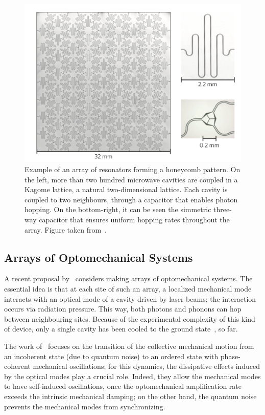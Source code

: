 \begin{figure}
    \centering
    \includegraphics[scale=0.6]{Figures/superconducting_circuits.png}
    \captionsetup{width=1.\linewidth}
    \caption{Example of an array of resonators forming a honeycomb pattern. On the left, more than two hundred microwave cavities are coupled in a Kagome lattice, a natural two-dimensional lattice. Each cavity is coupled to two neighbours, through a capacitor that enables photon hopping. On the bottom-right, it can be seen the simmetric three-way capacitor that ensures uniform hopping rates throughout the array. Figure taken from~\cite{supercircuitsQED}.}
    \label{fig:superconducting_circuits}
\end{figure}

\subsection{Arrays of Optomechanical Systems}
A recent proposal by~\cite{optomechanical_arrays} considers making arrays of optomechanical systems. The essential idea is that at each site of such an array, a localized mechanical mode interacts with an optical mode of a cavity driven by laser beams; the interaction occurs via radiation pressure. This way, both photons and phonons can hop between neighbouring sites. Because of the experimental complexity of this kind of device, only a single cavity has been cooled to the ground state~\cite{Lee_Haffner_Cross}, so far. 

The work of~\cite{optomechanical_arrays} focuses on the transition of the collective mechanical motion from an incoherent state (due to quantum noise) to an ordered state with phase-coherent mechanical oscillations; for this dynamics, the dissipative effects induced by the optical modes play a crucial role. Indeed, they allow the mechanical modes to have self-induced oscillations, once the optomechanical amplification rate exceeds the intrinsic mechanical damping; on the other hand, the quantum noise prevents the mechanical modes from synchronizing.


